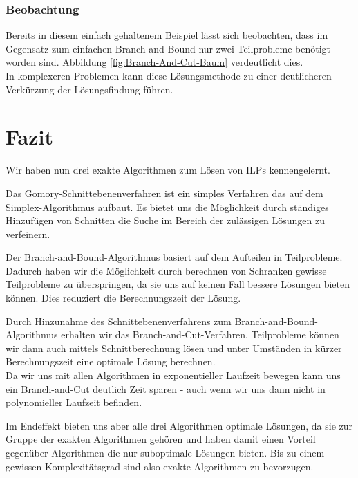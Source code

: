 \documentclass[tog]{acmsiggraph}
\begin{document}
\subsubsection*{Beobachtung}

Bereits in diesem einfach gehaltenem Beispiel lässt sich beobachten, dass im Gegensatz zum einfachen Branch-and-Bound nur zwei Teilprobleme benötigt worden sind. Abbildung \ref{fig:Branch-And-Cut-Baum} verdeutlicht dies.\\
In komplexeren Problemen kann diese Lösungsmethode zu einer deutlicheren Verkürzung der Lösungsfindung führen.


\section{Fazit}

Wir haben nun drei exakte Algorithmen zum Lösen von ILPs kennengelernt.

Das Gomory-Schnittebenenverfahren ist ein simples Verfahren das auf dem Simplex-Algorithmus aufbaut. Es bietet uns die Möglichkeit durch ständiges Hinzufügen von Schnitten die Suche im Bereich der zulässigen Lösungen zu verfeinern.

Der Branch-and-Bound-Algorithmus basiert auf dem Aufteilen in Teilprobleme. Dadurch haben wir die Möglichkeit durch berechnen von Schranken gewisse Teilprobleme zu überspringen, da sie uns auf keinen Fall bessere Lösungen bieten können. Dies reduziert die Berechnungszeit der Lösung.

Durch Hinzunahme des Schnittebenenverfahrens zum Branch-and-Bound-Algorithmus erhalten wir das Branch-and-Cut-Verfahren. Teilprobleme können wir dann auch mittels Schnittberechnung lösen und unter Umständen in kürzer Berechnungszeit eine optimale Lösung berechnen. \\
Da wir uns mit allen Algorithmen in exponentieller Laufzeit bewegen kann uns ein Branch-and-Cut deutlich Zeit sparen - auch wenn wir uns dann nicht in polynomieller Laufzeit befinden.

Im Endeffekt bieten uns aber alle drei Algorithmen optimale Lösungen, da sie zur Gruppe der exakten Algorithmen gehören und haben damit einen Vorteil gegenüber Algorithmen die nur suboptimale Lösungen bieten. Bis zu einem gewissen Komplexitätsgrad sind also exakte Algorithmen zu bevorzugen.

\newpage

\nocite{*}

\end{document}
